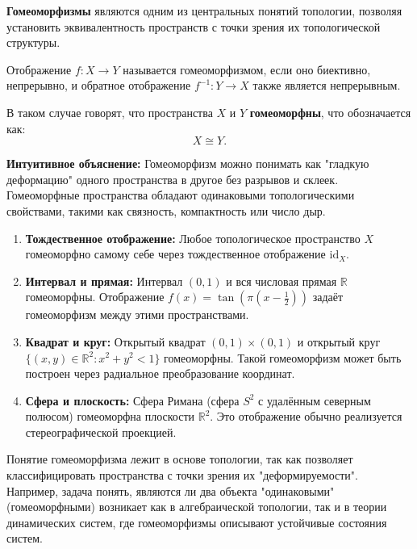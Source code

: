 \textbf{Гомеоморфизмы} являются одним из центральных понятий топологии, позволяя установить эквивалентность пространств с точки зрения их топологической структуры.

\begin{definition}[Гомеоморфизм]
	Отображение \( f : X \to Y \) называется гомеоморфизмом, если оно биективно, непрерывно, и обратное отображение \( f^{-1} : Y \to X \) также является непрерывным. 

	В таком случае говорят, что пространства \( X \) и \( Y \) \textbf{гомеоморфны}, что обозначается как:
	\[
		X \cong Y.
	\]
\end{definition}

\textbf{Интуитивное объяснение:} Гомеоморфизм можно понимать как "гладкую деформацию" одного пространства в другое без разрывов и склеек. Гомеоморфные пространства обладают одинаковыми топологическими свойствами, такими как связность, компактность или число дыр. 

\begin{example}
	\begin{enumerate}
		\item \textbf{Тождественное отображение:} Любое топологическое пространство \( X \) гомеоморфно самому себе через тождественное отображение \( \mathrm{id}_X \).
		
		\item \textbf{Интервал и прямая:} Интервал \( (0, 1) \) и вся числовая прямая \( \mathbb{R} \) гомеоморфны. Отображение \( f(x) = \tan\left(\pi \left(x - \frac{1}{2}\right)\right) \) задаёт гомеоморфизм между этими пространствами.

		\item \textbf{Квадрат и круг:} Открытый квадрат \( (0, 1) \times (0, 1) \) и открытый круг \( \{(x, y) \in \mathbb{R}^2 : x^2 + y^2 < 1\} \) гомеоморфны. Такой гомеоморфизм может быть построен через радиальное преобразование координат.

		\item \textbf{Сфера и плоскость:} Сфера Римана (сфера \( S^2 \) с удалённым северным полюсом) гомеоморфна плоскости \( \mathbb{R}^2 \). Это отображение обычно реализуется стереографической проекцией.
	\end{enumerate}
\end{example}

\bigskip

\begin{remark}
	Понятие гомеоморфизма лежит в основе топологии, так как позволяет классифицировать пространства с точки зрения их "деформируемости". Например, задача понять, являются ли два объекта "одинаковыми" (гомеоморфными) возникает как в алгебраической топологии, так и в теории динамических систем, где гомеоморфизмы описывают устойчивые состояния систем.
\end{remark}

